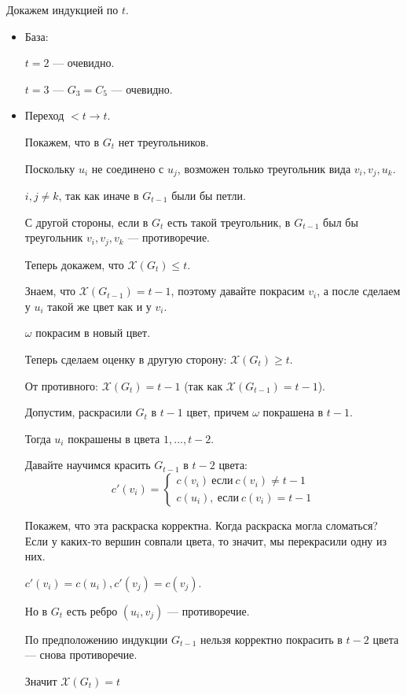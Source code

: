 Докажем индукцией по \( t \).
\begin{itemize}
    \item
        База:

        \( t = 2 \) --- очевидно.

        \( t = 3 \) --- \( G_3 = C_5 \) --- очевидно.
    \item
        Переход \( < t \to t \).

        Покажем, что в \( G_t \) нет треугольников.

        Поскольку \( u_i \) не соединено с \( u_j \),
        возможен только треугольник вида \( v_i, v_j, u_k \).

        \( i, j \neq k \), так как иначе в \( G_{t - 1} \) были бы петли.

        С другой стороны, если в \( G_t \) есть такой треугольник,
        в \( G_{t - 1} \) был бы треугольник \( v_i, v_j, v_k \) --- противоречие.

        Теперь докажем, что \( \mathcal{X}(G_t) \leq t \).

        Знаем, что \( \mathcal{X}(G_{t - 1}) = t - 1 \), поэтому давайте покрасим
        \( v_i \), а после сделаем у \( u_i \) такой же цвет как и у \( v_i \).

        \( \omega \) покрасим в новый цвет.

        Теперь сделаем оценку в другую сторону: \( \mathcal{X}(G_t) \geq t \).

        От противного: \( \mathcal{X}(G_t) = t - 1 \) (так как \( \mathcal{X}(G_{t - 1}) = t - 1 \)).

        Допустим, раскрасили \( G_t \) в \( t - 1 \) цвет, причем \( \omega \) покрашена в \( t - 1 \).

        Тогда \( u_i \) покрашены в цвета \( 1, \ldots, t - 2 \).

        Давайте научимся красить \( G_{t - 1} \) в \( t - 2 \) цвета:
        \[
            c'(v_i) = \begin{cases}
                c(v_i)\ \text{если} \ c(v_i) \neq t - 1
                \\
                c(u_i), \ \text{если} \ c(v_i) = t - 1
            \end{cases}
        \]

        Покажем, что эта раскраска корректна.
        Когда раскраска могла сломаться?
        Если у каких-то вершин совпали цвета, то значит, мы перекрасили одну из них.

        \( c'(v_i) = c(u_i), c'(v_j) = c(v_j) \).

        Но в \( G_t \) есть ребро \( (u_i, v_j) \) --- противоречие.

        По предположению индукции \( G_{t - 1} \) нельзя корректно
        покрасить в \( t - 2 \) цвета --- снова противоречие.

        Значит \( \mathcal{X}(G_t) = t \)
\end{itemize}

